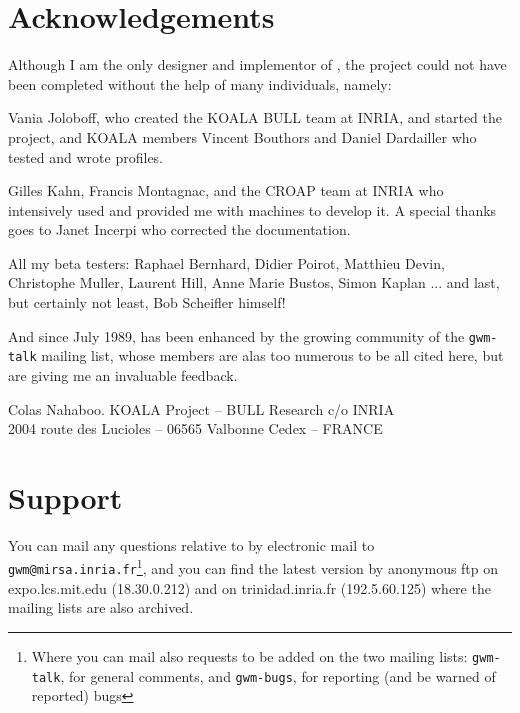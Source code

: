 \section*{Acknowledgements}

Although I am the only designer and implementor of {\GWM}, the project could
not have been completed without the help of many individuals, namely:

Vania Joloboff, who created the KOALA BULL team at INRIA, and started the 
{\GWM} project, and KOALA members Vincent Bouthors and Daniel Dardailler
who tested {\GWM} and wrote {\WOOL} profiles.

Gilles Kahn, Francis Montagnac, and the CROAP team at INRIA who intensively
used {\GWM} and provided me with machines to develop it. A special thanks
goes to Janet Incerpi who corrected the documentation.

All my beta testers: Raphael Bernhard, Didier Poirot, Matthieu Devin,
Christophe Muller, Laurent Hill, Anne Marie Bustos, Simon Kaplan ...
and last, but certainly not least, Bob Scheifler himself!

And since July 1989, {\GWM} has been enhanced by the growing community of
the {\tt gwm-talk} mailing list, whose members are alas too numerous to be all 
cited here, but are giving me an invaluable feedback.

\begin{flushright}
{\Large Colas Nahaboo.\quad}
{\small
KOALA Project -- BULL Research c/o INRIA\\
2004 route des Lucioles -- 06565 Valbonne Cedex -- FRANCE\\
}
\end{flushright}

\section*{Support}

\sloppy You can mail any questions relative to {\GWM} by electronic mail to
{\tt gwm@mirsa.inria.fr}\footnote{Where you can mail also requests to
be added on the two mailing lists: {\tt gwm-talk}, for general comments, and
{\tt gwm-bugs}, for reporting (and be warned of reported) bugs},
and you can find the latest {\GWM} version by anonymous ftp on expo.lcs.mit.edu
(18.30.0.212) and on trinidad.inria.fr (192.5.60.125) where the mailing lists
are also archived.
